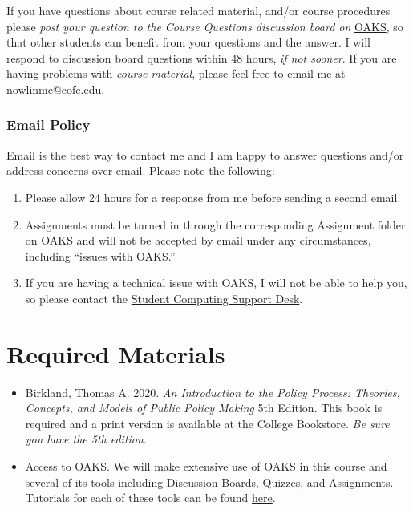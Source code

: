If you have questions about course related material, and/or course
procedures please \emph{post your question to the Course Questions
discussion board on} \href{lms.cofc.edu}{OAKS}, so that other students
can benefit from your questions and the answer. I will respond to
discussion board questions within 48 hours, \emph{if not sooner}. If you
are having problems with \emph{course material}, please feel free to
email me at \url{nowlinmc@cofc.edu}.

\hypertarget{email-policy}{%
\subsubsection{Email Policy}\label{email-policy}}

Email is the best way to contact me and I am happy to answer questions
and/or address concerns over email. Please note the following:

\begin{enumerate}
\def\labelenumi{\arabic{enumi}.}

\item
  Please allow 24 hours for a response from me before sending a second
  email.
\item
  Assignments must be turned in through the corresponding Assignment
  folder on OAKS and will not be accepted by email under any
  circumstances, including ``issues with OAKS.''
\item
  If you are having a technical issue with OAKS, I will not be able to
  help you, so please contact the
  \href{https://it.cofc.edu/help/studentcomputing.php}{Student Computing
  Support Desk}.
\end{enumerate}

\hypertarget{required-materials}{%
\section{Required Materials}\label{required-materials}}

\begin{itemize}
\item
  Birkland, Thomas A. 2020. \emph{An Introduction to the Policy Process:
  Theories, Concepts, and Models of Public Policy Making} 5th Edition.
  This book is required and a print version is available at the College
  Bookstore. \emph{Be sure you have the 5th edition}.
\item
  Access to \href{https://lms.cofc.edu/d2l/login}{OAKS}. We will make
  extensive use of OAKS in this course and several of its tools
  including Discussion Boards, Quizzes, and Assignments. Tutorials for
  each of these tools can be found
  \href{http://blogs.cofc.edu/oaks/students/tutorials/}{here}.
\end{itemize}

